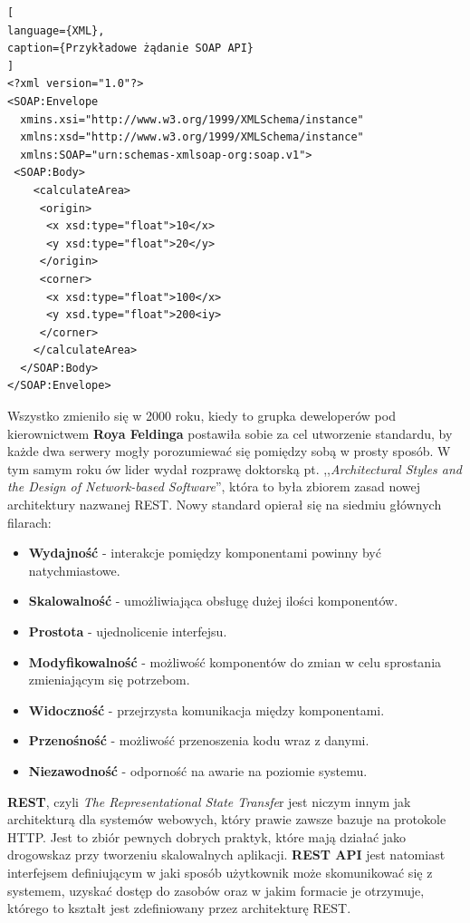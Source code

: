\documentclass[oneside,polski,logo,indent]{amuthesis}
\begin{document}
\begin{lstlisting}[
language={XML},
caption={Przykładowe żądanie SOAP API}
]
<?xml version="1.0"?>
<SOAP:Envelope 
  xmins.xsi="http://www.w3.org/1999/XMLSchema/instance" 
  xmlns:xsd="http://www.w3.org/1999/XMLSchema/instance" 
  xmlns:SOAP="urn:schemas-xmlsoap-org:soap.v1">
 <SOAP:Body>
    <calculateArea>
     <origin>
      <x xsd:type="float">10</x>
      <y xsd:type="float">20</y>
     </origin>
     <corner>
      <x xsd:type="float">100</x>
      <y xsd.type="float">200<iy>
     </corner>
    </calculateArea>
  </SOAP:Body>
</SOAP:Envelope>
\end{lstlisting}
Wszystko zmieniło się w 2000 roku, kiedy to grupka deweloperów pod kierownictwem \textbf{Roya Feldinga} postawiła sobie za cel utworzenie standardu, by każde dwa serwery mogły porozumiewać się pomiędzy sobą w prosty sposób. W tym samym roku ów lider wydał rozprawę doktorską pt. ,,\emph{Architectural Styles and the Design of Network-based Software}'', która to była zbiorem zasad nowej architektury nazwanej REST. Nowy standard opierał się na siedmiu głównych filarach:\newline 
\begin{itemize}
\item \textbf{Wydajność} - interakcje pomiędzy komponentami powinny być natychmiastowe.\newline
\item \textbf{Skalowalność} - umożliwiająca obsługę dużej ilości komponentów.\newline
\item \textbf{Prostota} - ujednolicenie interfejsu.\newline
\item \textbf{Modyfikowalność} - możliwość komponentów do zmian w celu sprostania zmieniającym się potrzebom.\newline
\item \textbf{Widoczność} - przejrzysta komunikacja między komponentami.\newline
\item \textbf{Przenośność} - możliwość przenoszenia kodu wraz z danymi.\newline
\item \textbf{Niezawodność} - odporność na awarie na poziomie systemu.\newline
\end{itemize}

\textbf{REST}, czyli \emph{The Representational State Transfe}r jest niczym innym jak architekturą dla systemów webowych, który prawie zawsze bazuje na protokole HTTP. Jest to zbiór pewnych dobrych praktyk, które mają działać jako drogowskaz przy tworzeniu skalowalnych aplikacji. \textbf{REST API} jest natomiast interfejsem definiującym w jaki sposób użytkownik może skomunikować się z systemem, uzyskać dostęp do zasobów oraz w jakim formacie je otrzymuje, którego to kształt jest zdefiniowany przez architekturę REST. 
\end{document}
